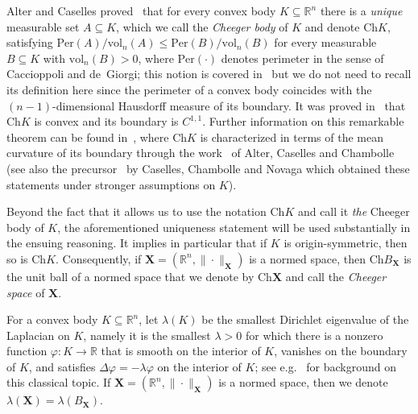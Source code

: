 \documentclass[11pt,reqno]{amsart}
\renewcommand{\le}{\leqslant}
\newcommand{\Per}{\mathrm{Per}}
\newcommand{\X}{\mathbf X}
\newcommand{\f}{\varphi}
\newcommand{\R}{\mathbb R}
\theoremstyle{remark}
\renewcommand{\subset}{\subseteq}
\newcommand{\Ch}{\mathrm{Ch}}
\newcommand{\vol}{\mathrm{vol}}
\renewcommand{\1}{\mathbf 1}
\begin{document}
Alter and Caselles proved~\cite{AC09} that for every convex body $K\subset \R^n$ there is a {\em unique} measurable set $A\subset K$, which we call  the {\em Cheeger body} of $K$ and denote $\Ch K$, satisfying $\Per(A)/\vol_n(A)\le \Per(B)/\vol_n(B)$ for every measurable $B\subset K$ with $\vol_n(B)>0$, where $\Per(\cdot)$ denotes perimeter in the sense of Caccioppoli and de~Giorgi; this notion is covered in~\cite{AFP00} but we do not need to recall its definition here since the perimeter of a convex body coincides with the $(n-1)$-dimensional Hausdorff measure of its boundary.
It was  proved in~\cite{AC09} that $\Ch K$ is convex and its boundary is $C^{1,1}$. Further information on this remarkable theorem can be found in~\cite{AC09}, where $\Ch K$ is characterized in terms of the mean curvature of its boundary through the work~\cite{ACC05} of Alter, Caselles and Chambolle (see also the precursor~\cite{CCN07} by Caselles, Chambolle and Novaga which obtained these statements under stronger assumptions on $K$).

Beyond the fact that it allows us to use the notation $\Ch K$ and call it {\em the} Cheeger body of $K$, the aforementioned uniqueness statement will be used substantially in the ensuing reasoning. It  implies in particular that if $K$ is origin-symmetric, then so is $\Ch K$. Consequently, if $\X=(\R^n,\|\cdot\|_\X)$ is a normed space, then $\Ch B_\X$ is the unit ball of a normed space that we denote by $\Ch \X$ and call  the {\em Cheeger space} of $\X$.


For a convex body $K\subset \R^n$, let $\lambda(K)$ be the smallest Dirichlet eigenvalue of the Laplacian on $K$, namely it is the smallest $\lambda>0$ for which there is a nonzero function $\f:K\to \R$ that is smooth on the interior of $K$, vanishes on the boundary of $K$, and satisfies $\Delta \f=-\lambda\f$ on the interior of $K$; see e.g.~\cite{PS51,CH53,Cha84} for background on this classical topic. If $\X=(\R^n,\|\cdot\|_\X)$ is a normed space, then we denote $\lambda(\X)=\lambda(B_\X)$.
\end{document}

